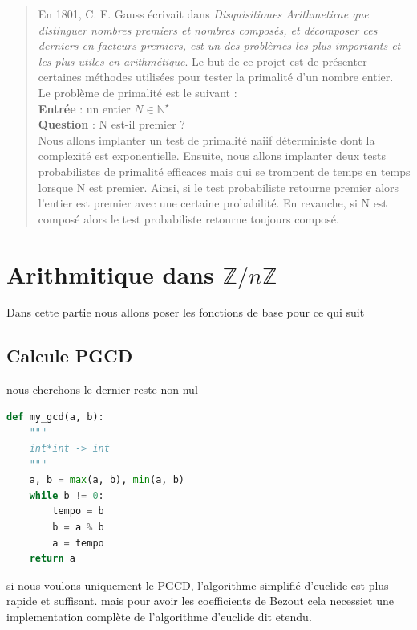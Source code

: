 \documentclass{article}
\begin{document}
\begin{abstract}

En 1801, C. F. Gauss écrivait dans \emph{Disquisitiones Arithmeticae que distinguer nombres
premiers et nombres composés, et décomposer ces derniers en facteurs premiers, est un des
problèmes les plus importants et les plus utiles en arithmétique}. Le but de ce projet est de
présenter certaines méthodes utilisées pour tester la primalité d’un nombre entier. \\

\indent Le problème de primalité est le suivant : \\
\indent \indent \textbf{Entrée} : un entier $N \in \mathbb{N}^{\star}$ \\
\indent \indent \textbf{Question} : N est-il premier ? \\

\noindent Nous allons implanter un test de primalité naiif déterministe dont la complexité est exponentielle. Ensuite, nous allons implanter deux tests probabilistes de primalité efficaces mais qui
se trompent de temps en temps lorsque N est premier. Ainsi, si le test probabiliste retourne
premier alors l’entier est premier avec une certaine probabilité. En revanche, si N est composé
alors le test probabiliste retourne toujours composé.
\end{abstract}

\section{Arithmitique dans $\mathbb{Z}/n\mathbb{Z}$}
Dans cette partie nous allons poser les fonctions de base pour ce qui suit
\subsection{Calcule PGCD}

nous cherchons le dernier reste non nul
\begin{lstlisting}[language=Python, caption=Implémentation de l'algorithme d'euclide]
def my_gcd(a, b):
    """
    int*int -> int
    """
    a, b = max(a, b), min(a, b)
    while b != 0:
        tempo = b
        b = a % b
        a = tempo
    return a
\end{lstlisting}

si nous voulons uniquement le PGCD, l'algorithme simplifié d'euclide est plus rapide et suffisant. mais pour avoir les coefficients de Bezout cela necessiet une implementation complète de l'algorithme d'euclide dit etendu.
\end{document}
